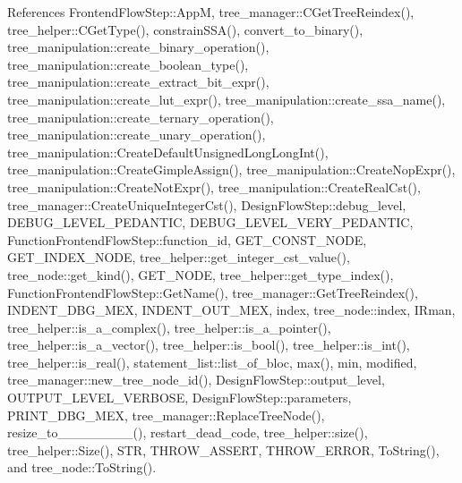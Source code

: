 References Frontend\+Flow\+Step\+::\+AppM, tree\+\_\+manager\+::\+C\+Get\+Tree\+Reindex(), tree\+\_\+helper\+::\+C\+Get\+Type(), constrain\+S\+S\+A(), convert\+\_\+to\+\_\+binary(), tree\+\_\+manipulation\+::create\+\_\+binary\+\_\+operation(), tree\+\_\+manipulation\+::create\+\_\+boolean\+\_\+type(), tree\+\_\+manipulation\+::create\+\_\+extract\+\_\+bit\+\_\+expr(), tree\+\_\+manipulation\+::create\+\_\+lut\+\_\+expr(), tree\+\_\+manipulation\+::create\+\_\+ssa\+\_\+name(), tree\+\_\+manipulation\+::create\+\_\+ternary\+\_\+operation(), tree\+\_\+manipulation\+::create\+\_\+unary\+\_\+operation(), tree\+\_\+manipulation\+::\+Create\+Default\+Unsigned\+Long\+Long\+Int(), tree\+\_\+manipulation\+::\+Create\+Gimple\+Assign(), tree\+\_\+manipulation\+::\+Create\+Nop\+Expr(), tree\+\_\+manipulation\+::\+Create\+Not\+Expr(), tree\+\_\+manipulation\+::\+Create\+Real\+Cst(), tree\+\_\+manager\+::\+Create\+Unique\+Integer\+Cst(), Design\+Flow\+Step\+::debug\+\_\+level, D\+E\+B\+U\+G\+\_\+\+L\+E\+V\+E\+L\+\_\+\+P\+E\+D\+A\+N\+T\+IC, D\+E\+B\+U\+G\+\_\+\+L\+E\+V\+E\+L\+\_\+\+V\+E\+R\+Y\+\_\+\+P\+E\+D\+A\+N\+T\+IC, Function\+Frontend\+Flow\+Step\+::function\+\_\+id, G\+E\+T\+\_\+\+C\+O\+N\+S\+T\+\_\+\+N\+O\+DE, G\+E\+T\+\_\+\+I\+N\+D\+E\+X\+\_\+\+N\+O\+DE, tree\+\_\+helper\+::get\+\_\+integer\+\_\+cst\+\_\+value(), tree\+\_\+node\+::get\+\_\+kind(), G\+E\+T\+\_\+\+N\+O\+DE, tree\+\_\+helper\+::get\+\_\+type\+\_\+index(), Function\+Frontend\+Flow\+Step\+::\+Get\+Name(), tree\+\_\+manager\+::\+Get\+Tree\+Reindex(), I\+N\+D\+E\+N\+T\+\_\+\+D\+B\+G\+\_\+\+M\+EX, I\+N\+D\+E\+N\+T\+\_\+\+O\+U\+T\+\_\+\+M\+EX, index, tree\+\_\+node\+::index, I\+Rman, tree\+\_\+helper\+::is\+\_\+a\+\_\+complex(), tree\+\_\+helper\+::is\+\_\+a\+\_\+pointer(), tree\+\_\+helper\+::is\+\_\+a\+\_\+vector(), tree\+\_\+helper\+::is\+\_\+bool(), tree\+\_\+helper\+::is\+\_\+int(), tree\+\_\+helper\+::is\+\_\+real(), statement\+\_\+list\+::list\+\_\+of\+\_\+bloc, max(), min, modified, tree\+\_\+manager\+::new\+\_\+tree\+\_\+node\+\_\+id(), Design\+Flow\+Step\+::output\+\_\+level, O\+U\+T\+P\+U\+T\+\_\+\+L\+E\+V\+E\+L\+\_\+\+V\+E\+R\+B\+O\+SE, Design\+Flow\+Step\+::parameters, P\+R\+I\+N\+T\+\_\+\+D\+B\+G\+\_\+\+M\+EX, tree\+\_\+manager\+::\+Replace\+Tree\+Node(), resize\+\_\+to\+\_\+\_\+\_\+\_\+\_\+\_\+\_\+\_(), restart\+\_\+dead\+\_\+code, tree\+\_\+helper\+::size(), tree\+\_\+helper\+::\+Size(), S\+TR, T\+H\+R\+O\+W\+\_\+\+A\+S\+S\+E\+RT, T\+H\+R\+O\+W\+\_\+\+E\+R\+R\+OR, To\+String(), and tree\+\_\+node\+::\+To\+String().



